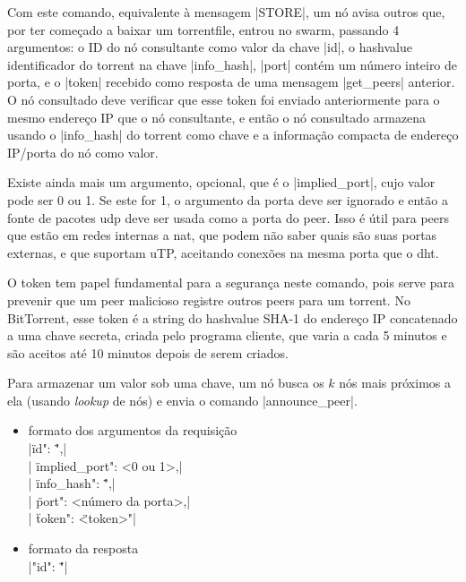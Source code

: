 

Com este comando, equivalente à mensagem \bverb|STORE|, um nó avisa outros que, por ter
começado a baixar um \gls*{torrentfile}, entrou no \gls*{swarm}, passando 4 argumentos:
o ID do nó consultante como valor da chave \bverb|id|, o \gls*{hashvalue} identificador
do \gls*{torrent} na chave \bverb|info_hash|, \bverb|port| contém um número inteiro de
porta, e o \bverb|token| recebido como resposta de uma mensagem \bverb|get_peers|
anterior. O nó consultado deve verificar que esse token foi enviado anteriormente para o
mesmo endereço IP que o nó consultante, e então o nó consultado armazena usando o
\bverb|info_hash| do torrent como chave e a informação compacta de endereço IP/porta do
nó como valor.

Existe ainda mais um argumento, opcional, que é o \bverb|implied_port|, cujo valor pode
ser 0 ou 1. Se este for 1, o argumento da porta deve ser ignorado e então a fonte de
pacotes \gls*{udp} deve ser usada como a porta do \gls*{peer}. Isso é útil para
\glspl*{peer} que estão em redes internas a \gls{nat}, que podem não saber quais são
suas portas externas, e que suportam uTP, aceitando conexões na mesma porta que o
\gls*{dht}.

O token tem papel fundamental para a segurança neste comando, pois serve para prevenir
que um \gls*{peer} malicioso registre outros \glspl*{peer} para um \gls*{torrent}. No
BitTorrent, esse token é a \gls*{string} do \gls*{hashvalue} SHA-1 do endereço IP
concatenado a uma chave secreta, criada pelo programa cliente, que varia a cada 5
minutos e são aceitos até 10 minutos depois de serem criados.

Para armazenar um valor sob uma chave, um nó busca os $k$ nós mais próximos a ela
(usando \emph{lookup} de nós) e envia o comando \bverb|announce_peer|.

\newpage
\begin{itemize}
    \item formato dos argumentos da requisição \\
        \sverb|{\"id": \"<IDs dos nós consultantes>",| \\
        \sverb| \"implied_port": <0 ou 1>,| \\
        \sverb| \"info_hash": \"<hash de 20 bytes do torrent>",| \\
        \sverb| \"port": <número da porta>,| \\
        \sverb| \"token": \"<token>"}|

    \item formato da resposta \\
        \sverb|{"id": \"<IDs dos nós consultados>"}|
\end{itemize}

